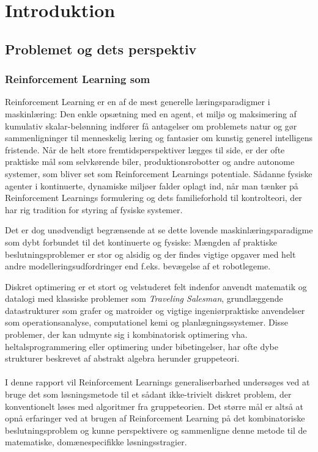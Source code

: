 \documentclass[../main.tex]{subfiles}
\begin{document}
\chapter{Introduktion}
\section{Problemet og dets perspektiv}
\subsection{Reinforcement Learning som }
Reinforcement Learning er en af de mest generelle læringsparadigmer i maskinlæring: 
Den enkle opsætning med en agent, et miljø og maksimering af kumulativ skalar-belønning indfører få antagelser om problemets natur og gør sammenligninger til menneskelig læring og fantasier om kunstig generel intelligens fristende.
Når de helt store fremtidsperspektiver lægges til side, er der ofte praktiske mål som selvkørende biler, produktionsrobotter og andre autonome systemer, som bliver set som Reinforcement Learnings potentiale.
Sådanne fysiske agenter i kontinuerte, dynamiske miljøer falder oplagt ind, når man tænker på Reinforcement Learnings formulering og dets familieforhold til kontrolteori, der har rig tradition for styring af fysiske systemer. 

Det er dog unødvendigt begrænsende at se dette lovende maskinlæringsparadigme som dybt forbundet til det kontinuerte og fysiske: Mængden af praktiske beslutningsproblemer er stor og alsidig og der findes vigtige opgaver med helt andre modelleringsudfordringer end f.eks. bevægelse af et robotlegeme.

Diskret optimering er et stort og velstuderet felt indenfor anvendt matematik og datalogi med klassiske problemer som \textit{Traveling Salesman}, grundlæggende datastrukturer som grafer og matroider og vigtige ingeniørpraktiske anvendelser som operationsanalyse, computationel kemi og planlægningssystemer. 
Disse problemer, der kan udmynte sig i kombinatorisk optimering vha. heltalsprogrammering eller optimering under bibetingelser, har ofte dybe strukturer beskrevet af abstrakt algebra herunder gruppeteori.
\\
\\
I denne rapport vil Reinforcement Learnings generaliserbarhed undersøges ved at bruge det som løsningsmetode til et sådant ikke-trivielt diskret problem, der konventionelt løses med algoritmer fra gruppeteorien.
Det større mål er altså at opnå erfaringer ved at brugen af Reinforcement Learning på det kombinatoriske beslutningsproblem og kunne perspektivere og sammenligne denne metode til de matematiske, domænespecifikke løsningsstragier. 
\end{document}

